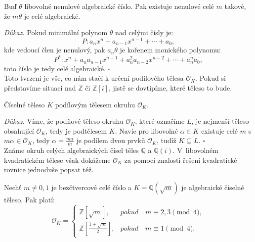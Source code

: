 \documentclass[12pt]{report}
\begin{document}
\begin{lemma}\label{asob}
Buď $\theta$ libovolné nenulové algebraické číslo. Pak existuje nenulové celé $m$ takové, že $m \theta$ je celé algebraické.
\end{lemma}
\noindent \textit{Důkaz.} Pokud minimální polynom $\theta$ nad celými čísly je:
\begin{equation*}
P : a_n x^n + a_{n-1} x^{n-1} + \cdots + a_0,
\end{equation*}
kde vedoucí člen je nenulový, pak $a_n \theta$ je kořenem monického polynomu:
\begin{equation*}
P^* : x^n +a_n  a_{n-1} x^{n-1} + a_n ^2 a_{n-2} x^{n-2} + \cdots + a_n ^n a_0,
\end{equation*}
toto číslo je tedy celé algebraické. \hfill $\square$\\

Toto tvrzení je vše, co nám stačí k určení podílového tělesa $\mathcal{O}_K$. Pokud si představíme situaci nad $\mathbb{Z}$ či $\mathbb{Z}[i]$, jistě se dovtípíme, které těleso to bude.

\begin{dusledek}
Číselné těleso $K$ podílovým tělesem okruhu $\mathcal{O}_K$. 
\end{dusledek}
\noindent \textit{Důkaz.} Víme, že podílové těleso okruhu $\mathcal{O}_K$, které označíme $L$, je nejmenší těleso obsahující $\mathcal{O}_K$, tedy je podtělesem $K$. Navíc pro libovolné $\alpha \in K$ existuje celé $m$ s $m \alpha \in \mathcal{O}_K$, tedy $\alpha = \frac{m \alpha}{m}$ je podílem dvou prvků $\mathcal{O}_K$, tudíž $K \subseteq L$. \hfill $\square$\\

Známe okruh celých algebraických čísel těles $\mathbb{Q}$ a $\mathbb{Q}(i)$. V~libovolném kvadratickém tělese však dokážeme $\mathcal{O}_K$ za pomocí znalosti řešení kvadratické rovnice jednoduše popsat též.

 \begin{veta}\label{cela}
Nechť $m \neq 0,1$ je bezčtvercové celé číslo a $K = \mathbb{Q}(\sqrt{m})$ je algebraické číselné těleso. Pak platí:
\begin{equation*}
\mathcal{O}_K = \begin{cases}
      \mathbb{Z}[\sqrt{m}], & \textit{pokud} \quad  m \equiv 2,3 \pmod{4},\\
      \mathbb{Z}\left[\frac{1+\sqrt{m}}{2}\right], & \textit{pokud} \quad m \equiv 1 \pmod{4}.
    \end{cases}
\end{equation*}
\end{veta}
\end{document}
